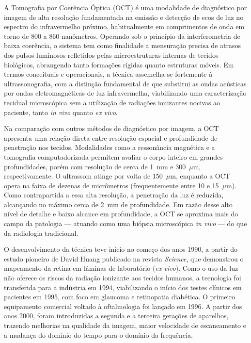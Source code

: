 \documentclass[a4paper,12pt,oneside,openright]{abntex2}
\begin{document}
A Tomografia por Coerência Óptica (OCT) é uma modalidade de diagnóstico por imagem de alta resolução fundamentada na emissão e detecção de ecos de luz no espectro do infravermelho próximo, habitualmente em comprimentos de onda em torno de 800 a 860 nanômetros. Operando sob o princípio da interferometria de baixa coerência, o sistema tem como finalidade a mensuração precisa de atrasos dos pulsos luminosos refletidos pelas microestruturas internas de tecidos biológicos, abrangendo tanto formações rígidas quanto estruturas móveis. Em termos conceituais e operacionais, a técnica assemelha-se fortemente à ultrassonografia, com a distinção fundamental de que substitui as ondas acústicas por ondas eletromagnéticas de luz infravermelha, viabilizando uma caracterização tecidual microscópica sem a utilização de radiações ionizantes nocivas ao paciente, tanto \textit{in vivo} quanto \textit{ex vivo}.

Na comparação com outros métodos de diagnóstico por imagem, a OCT apresenta uma relação direta entre resolução espacial e profundidade de penetração nos tecidos. Modalidades como a ressonância magnética e a tomografia computadorizada permitem avaliar o corpo inteiro em grandes profundidades, porém com resolução de cerca de 1~mm e 300~$\mu$m, respectivamente. O ultrassom atinge por volta de 150~$\mu$m, enquanto a OCT opera na faixa de dezenas de micrômetros (frequentemente entre 10 e 15~$\mu$m). Como contrapartida a essa alta resolução, a penetração da luz é reduzida, alcançando no máximo cerca de 2~mm de profundidade. Em razão desse alto nível de detalhe e baixo alcance em profundidade, a OCT se aproxima mais do campo da patologia — atuando como uma biópsia microscópica \textit{in vivo} — do que da radiologia tradicional.

O desenvolvimento da técnica teve início no começo dos anos 1990, a partir do estudo pioneiro de David Huang publicado na revista \textit{Science}, que demonstrou o mapeamento da retina em lâminas de laboratório (\textit{ex vivo}). Como o uso da luz não oferece os riscos da radiação ionizante aos tecidos humanos, a tecnologia foi transferida para a indústria em 1994, viabilizando o início dos testes clínicos em pacientes em 1995, com foco em glaucoma e retinopatia diabética. O primeiro equipamento comercial voltado à oftalmologia foi lançado em 1996. A partir dos anos 2000, foram introduzidas a segunda e a terceira gerações de aparelhos, trazendo melhorias na qualidade da imagem, maior velocidade de escaneamento e a mudança do domínio do tempo para o domínio da frequência.
\end{document}
